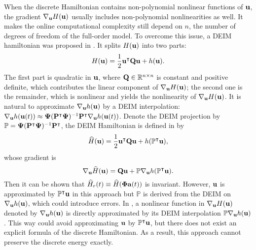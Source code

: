 \documentclass[11pt]{article}
\newcommand{\bP}{{\bf P}}
\begin{document}
When the discrete Hamiltonian contains non-polynomial nonlinear functions of ${\bf u}$, the gradient $\nabla_{{\bf u}} H({\bf u})$ usually includes non-polynomial nonlinearities as well. It makes the online computational complexity still depend on $n$, the number of degrees of freedom of the full-order model. To overcome this issue, a DEIM hamiltonian was proposed in \cite{chaturantabut2016structure}. 
It splits $H({\bf u})$ into two parts: 
\begin{equation}
H({\bf u}) = \frac{1}{2} {\bf u}^\intercal {\bf Q} {\bf u} + h({\bf u}).
\label{eq: ham}
\end{equation}
The first part is quadratic in ${\bf u}$, where ${\bf Q}\in \mathbb{R}^{n\times n}$ is constant and positive definite, which contributes the linear component of $\nabla_{{\bf u}} H({\bf u})$; the second one is the remainder, which is nonlinear and yields the nonlinearity of $\nabla_{{\bf u}} H({\bf u})$.  
It is natural to approximate $\nabla_{{\bf u}} h({\bf u})$ by a DEIM interpolation: 
$\nabla_{\bu} h(\bu(t)) \approx \bPsi (\bP^\intercal \bPsi)^{-1} \bP^\intercal\nabla_{\bu} h(\bu(t)) $. 
Denote the DEIM projection by $\mathbb{P} = \bPsi (\bP^\intercal \bPsi)^{-1} \bP^\intercal$, the DEIM Hamiltonian is defined in \cite{chaturantabut2016structure} by   
$$\widehat{H}({\bf u}) = \frac{1}{2} {\bf u}^\intercal {\bf Q} {\bf u} + h(\mathbb{P}^\intercal {\bf u}),
$$
whose gradient is 
$$\nabla_{{\bf u}}\widehat{H}({\bf u}) = {\bf Q} {\bf u} + \mathbb{P} \nabla_{{\bf u}} h(\mathbb{P}^\intercal {\bf u}).
$$
Then it can be shown that $\widehat{H}_r(t)\equiv \widehat{H}(\boldsymbol{\Phi} {\bf a}(t))$ is invariant. 
However, ${\bf u}$ is approximated by $\mathbb{P}^\intercal {\bf u}$ in this approach but $\mathbb{P}$ is derived from the DEIM on $\nabla_{{\bf u}} h({\bf u})$, which could introduce errors.
%
In \cite{karasozen2018energy}, a nonlinear function in $\nabla_{{\bf u}} H({\bf u})$ denoted by $\nabla_{{\bf u}} h({\bf u})$ is directly approximated by its DEIM interpolation $\mathbb{P} \nabla_{{\bf u}} h({\bf u})$. This way could avoid approximating ${\bf u}$ by $\mathbb{P}^\intercal {\bf u}$, but there does not exist an explicit formula of the discrete Hamiltonian.  
As a result, this approach cannot preserve the discrete energy exactly.

%
\end{document}
